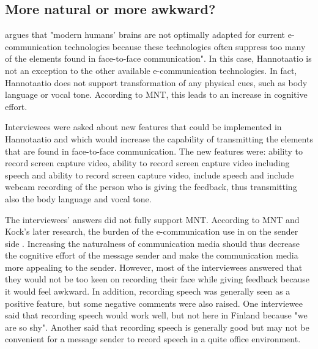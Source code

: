 \documentclass[english,12pt,a4paper,pdftex]{article}
\begin{document}
\subsection{More natural or more awkward?}

\citet{kock2005} argues that "modern humans' brains are not optimally adapted for current e-communication technologies because these technologies often suppress too many of the elements found in face-to-face communication". In this case, Hannotaatio is not an exception to the other available e-communication technologies. In fact, Hannotaatio does not support transformation of any physical cues, such as body language or vocal tone. According to \ac{MNT}, this leads to an increase in cognitive effort.

Interviewees were asked about new features that could be implemented in Hannotaatio and which would increase the capability of transmitting the elements that are found in face-to-face communication. The new features were: ability to record screen capture video, ability to record screen capture video including speech and ability to record screen capture video, include speech and include webcam recording of the person who is giving the feedback, thus transmitting also the body language and vocal tone.

The interviewees' answers did not fully support \ac{MNT}. According to \ac{MNT} and Kock's later research, the burden of the e-communication use in on the sender side \citep{kock2007}. Increasing the naturalness of communication media should thus decrease the cognitive effort of the message sender and make the communication media more appealing to the sender. However, most of the interviewees answered that they would not be too keen on recording their face while giving feedback because it would feel awkward. In addition, recording speech was generally seen as a positive feature, but some negative comments were also raised. One interviewee said that recording speech would work well, but not here in Finland because "we are so shy". Another said that recording speech is generally good but may not be convenient for a message sender to record speech in a quite office environment.

\end{document}
